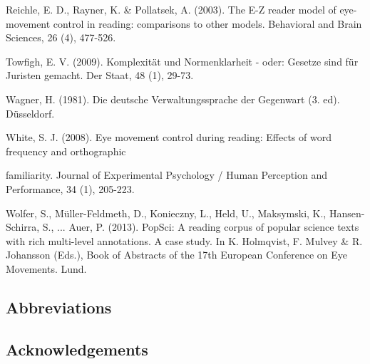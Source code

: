\documentclass[output=paper]{langsci/langscibook}
\begin{document}
Reichle, E. D., Rayner, K. \& Pollatsek, A. (2003). The E-Z reader model of eye-movement control in reading: comparisons to other models. Behavioral and Brain Sciences, 26 (4), 477-526.



Towfigh, E. V. (2009). Komplexität und Normenklarheit - oder: Gesetze sind für Juristen gemacht. Der Staat, 48 (1), 29-73.



Wagner, H. (1981). Die deutsche Verwaltungssprache der Gegenwart (3. ed). Düsseldorf.



White, S. J. (2008). Eye movement control during reading: Effects of word frequency and orthographic



familiarity. Journal of Experimental Psychology / Human Perception and Performance, 34 (1), 205-223.



Wolfer, S., Müller-Feldmeth, D., Konieczny, L., Held, U., Maksymski, K., Hansen-Schirra, S., ... Auer, P. (2013). PopSci: A reading corpus of popular science texts with rich multi-level annotations. A case study. In K. Holmqvist, F. Mulvey \& R. Johansson (Eds.), Book of Abstracts of the 17th European Conference on Eye Movements. Lund.



\subsection*{Abbreviations}
\subsection*{Acknowledgements}

\printbibliography[heading=subbibliography,notkeyword=this]
\end{document}
